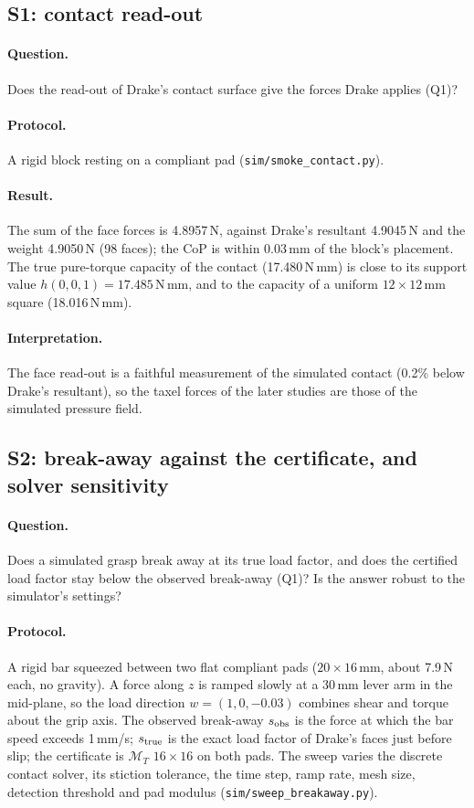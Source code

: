 \documentclass[11pt,a4paper]{article}
\newcommand{\M}{\mathcal M}
\newcommand{\code}[1]{\texttt{#1}}
\begin{document}
\subsection{S1: contact read-out}
\label{sec:S1}
\paragraph{Question.} Does the read-out of Drake's contact surface give the forces Drake applies (Q1)?
\paragraph{Protocol.} A rigid block resting on a compliant pad (\code{sim/smoke\_contact.py}).
\paragraph{Result.} The sum of the face forces is 4.8957\,N, against Drake's resultant 4.9045\,N and the weight 4.9050\,N (98 faces); the CoP is
within 0.03\,mm of the block's placement. The true pure-torque capacity of the contact (17.480\,N\,mm) is close to its support value
$h(0,0,1)=17.485$\,N\,mm, and to the capacity of a uniform $12\times12$\,mm square (18.016\,N\,mm).
\paragraph{Interpretation.} The face read-out is a faithful measurement of the simulated contact (0.2\% below Drake's resultant), so the taxel
forces of the later studies are those of the simulated pressure field.

\subsection{S2: break-away against the certificate, and solver sensitivity}
\label{sec:S2}
\paragraph{Question.} Does a simulated grasp break away at its true load factor, and does the certified load factor stay below the observed
break-away (Q1)? Is the answer robust to the simulator's settings?
\paragraph{Protocol.} A rigid bar squeezed between two flat compliant pads ($20\times16$\,mm, about 7.9\,N each, no gravity). A force along $z$ is
ramped slowly at a 30\,mm lever arm in the mid-plane, so the load direction $w=(1,0,-0.03)$ combines shear and torque about the grip axis. The
observed break-away $s_{\rm obs}$ is the force at which the bar speed exceeds 1\,mm/s; $s_{\rm true}$ is the exact load factor of Drake's faces just
before slip; the certificate is $\M_T$ $16\times16$ on both pads. The sweep varies the discrete contact solver, its stiction tolerance, the time
step, ramp rate, mesh size, detection threshold and pad modulus (\code{sim/sweep\_breakaway.py}).
\end{document}
